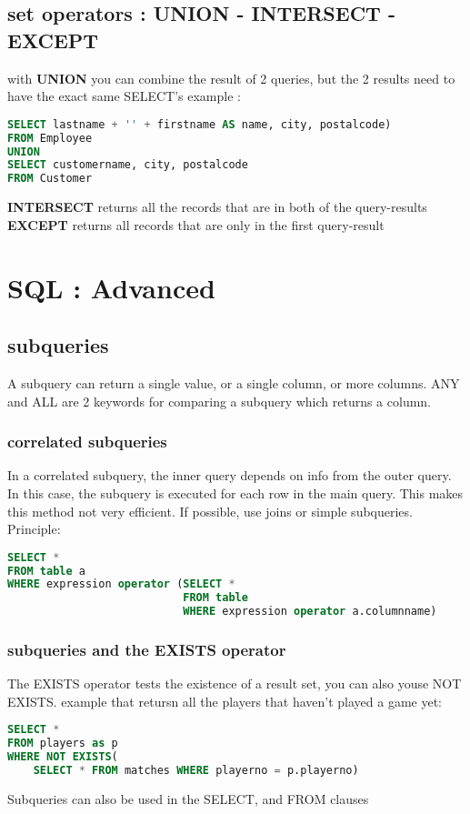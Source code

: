 \documentclass{report}
\begin{document}
	\section{set operators : UNION - INTERSECT - EXCEPT}
	with \textbf{UNION} you can combine the result of 2 queries, but the 2 results need to have the exact same SELECT's
	example : 
	\begin{lstlisting}[language=SQL]
SELECT lastname + '' + firstname AS name, city, postalcode)
FROM Employee
UNION
SELECT customername, city, postalcode
FROM Customer\end{lstlisting}
	\textbf{INTERSECT} returns all the records that are in both of the query-results
	\textbf{EXCEPT} returns all records that are only in the first query-result
	
	\chapter{SQL : Advanced}
	\section{subqueries}
	A subquery can return a single value, or a single column, or more columns.
	ANY and ALL are 2 keywords for comparing a subquery which returns a column.
	\subsection{correlated subqueries}
	In a correlated subquery, the inner query depends on info from the outer query. In this case, the subquery is executed for each row in the main query. This makes this method not very efficient. If possible, use joins or simple subqueries. 
	Principle: 
	\begin{lstlisting}[language=SQL]
SELECT * 
FROM table a
WHERE expression operator (SELECT *
						   FROM table 
						   WHERE expression operator a.columnname)\end{lstlisting}
	\subsection{subqueries and the EXISTS operator}
	The EXISTS operator tests the existence of a result set, you can also youse NOT EXISTS. example that retursn all the players that haven't played a game yet: 
	\begin{lstlisting}[language=SQL]
SELECT * 
FROM players as p
WHERE NOT EXISTS(
	SELECT * FROM matches WHERE playerno = p.playerno)\end{lstlisting}
	Subqueries can also be used in the SELECT, and FROM clauses
\end{document}
